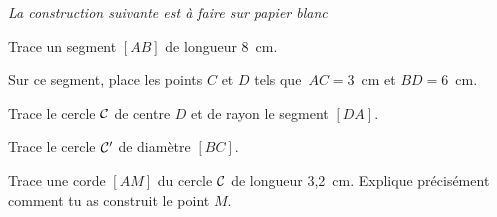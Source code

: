 {\em La construction suivante est à faire sur papier blanc}
\begin{myenumerate}
  \item Trace un segment $[AB]$ de longueur 8~cm.
  \item Sur ce segment, place les points $C$ et $D$ tels que $AC=3$~cm et $BD=6$~cm.
  \item Trace le cercle $\cal C$ de centre $D$ et de rayon le segment $[DA]$.
  \item Trace le cercle ${\cal C}'$ de diamètre $[BC]$.
  \item Trace une corde $[AM]$ du cercle $\cal C$ de longueur 3,2~cm. Explique précisément comment tu as construit le point $M$.
\end{myenumerate}